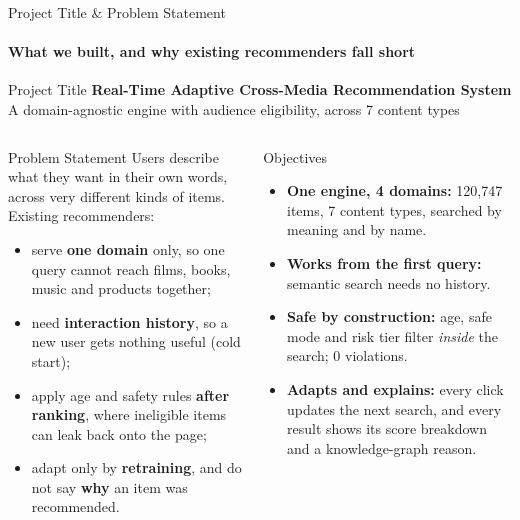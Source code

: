 \documentclass[aspectratio=169, 11pt]{beamer}
\begin{document}
\begin{frame}{Project Title \& Problem Statement}
    \framesubtitle{What we built, and why existing recommenders fall short}
    \begin{block}{Project Title}
        \centering
        \textbf{Real-Time Adaptive Cross-Media Recommendation System}\\
        {\footnotesize A domain-agnostic engine with audience eligibility, across 7 content types}
    \end{block}
    \begin{columns}[T]
        \begin{block}{Problem Statement}
            \scriptsize
            Users describe what they want in their own words, across very different kinds of items. Existing recommenders:
            \begin{itemize}
                \item serve \textbf{one domain} only, so one query cannot reach films, books, music and products together;
                \item need \textbf{interaction history}, so a new user gets nothing useful (cold start);
                \item apply age and safety rules \textbf{after ranking}, where ineligible items can leak back onto the page;
                \item adapt only by \textbf{retraining}, and do not say \textbf{why} an item was recommended.
            \end{itemize}
        \end{block}
        \begin{block}{Objectives}
            \scriptsize
            \begin{itemize}
                \item \textbf{One engine, 4 domains:} 120,747 items, 7 content types, searched by meaning and by name.
                \item \textbf{Works from the first query:} semantic search needs no history.
                \item \textbf{Safe by construction:} age, safe mode and risk tier filter \emph{inside} the search; 0 violations.
                \item \textbf{Adapts and explains:} every click updates the next search, and every result shows its score breakdown and a knowledge-graph reason.
            \end{itemize}
        \end{block}
    \end{columns}
\end{frame}
\end{document}
